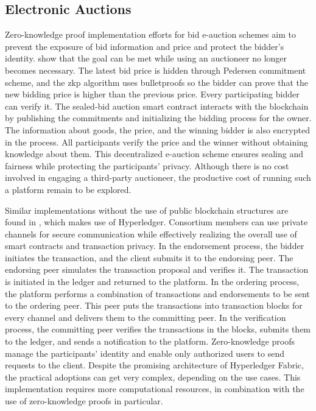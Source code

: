 \subsection{Electronic Auctions}
Zero-knowledge proof implementation efforts for bid e-auction schemes aim to prevent the exposure of bid information and price and protect the bidder's identity. \citet{LiXue} show that the goal can be met while using an auctioneer no longer becomes necessary. The latest bid price is hidden through Pedersen commitment scheme, and the \acrshort{zkp} algorithm uses bulletproofs so the bidder can prove that the new bidding price is higher than the previous price. Every participating bidder can verify it. The sealed-bid auction smart contract interacts with the blockchain by publishing the commitments and initializing the bidding process for the owner. The information about goods, the price, and the winning bidder is also encrypted in the process. All participants verify the price and the winner without obtaining knowledge about them. This decentralized e-auction scheme ensures sealing and fairness while protecting the participants' privacy. Although there is no cost involved in engaging a third-party auctioneer, the productive cost of running such a platform remain to be explored.

Similar implementations without the use of public blockchain structures are found in \citet{WangZhaoMu}, which makes use of Hyperledger. Consortium members can use private channels for secure communication while effectively realizing the overall use of smart contracts and transaction privacy. In the endorsement process, the bidder initiates the transaction, and the client submits it to the endorsing peer. The endorsing peer simulates the transaction proposal and verifies it. The transaction is initiated in the ledger and returned to the platform. In the ordering process, the platform performs a combination of transactions and endorsements to be sent to the ordering peer. This peer puts the transactions into transaction blocks for every channel and delivers them to the committing peer. In the verification process, the committing peer verifies the transactions in the blocks, submits them to the ledger, and sends a notification to the platform. Zero-knowledge proofs manage the participants' identity and enable only authorized users to send requests to the client. Despite the promising architecture of Hyperledger Fabric, the practical adoptions can get very complex, depending on the use cases. This implementation requires more computational resources, in combination with the use of zero-knowledge proofs in particular.

